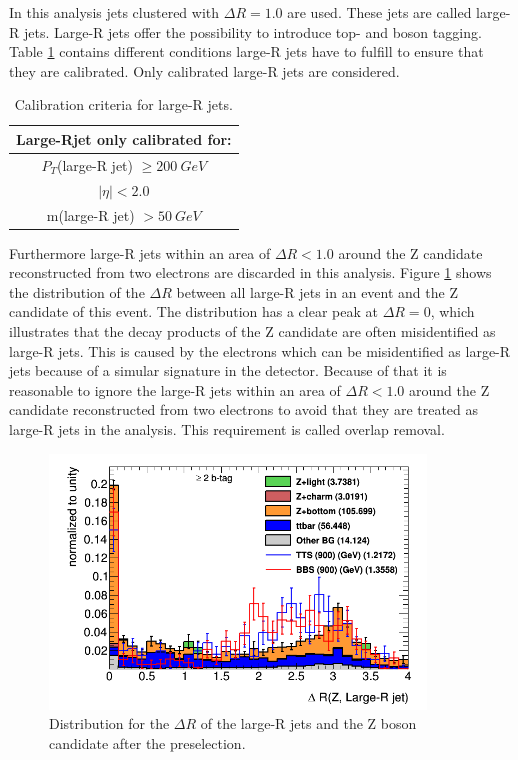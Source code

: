 In this analysis jets clustered with  $\Delta R = 1.0$ are used.   
These jets are called large-R jets. 
Large-R jets offer the possibility to introduce top- and boson tagging.
Table \ref{calibration} contains different conditions large-R jets have to fulfill to ensure that they are calibrated.
Only calibrated large-R jets are considered. 

\newpage

\begin{table}[h!]
\centering
\setlength{\tabcolsep}{3cm}
\begin{tabular}{|c|} 
\hline
\textbf{Large-Rjet only calibrated for:}\\
\hline
\hline
$P_{T}$(large-R jet) $\geq \SI{200}{GeV}$\\
$\mid \eta \mid < 2.0$ \\
m(large-R jet) $> \SI{50}{GeV}$\\
\hline
\end{tabular}
\caption{Calibration criteria for large-R jets.}
\label{calibration}
\end{table}


Furthermore large-R jets within an area of $\Delta R < 1.0$ around the Z candidate reconstructed from two electrons are discarded in this analysis.
Figure \ref{deltaR} shows the distribution of the $\Delta R$ between all large-R jets in an event and the Z candidate of this event.
The distribution has a clear peak at $\Delta R = 0$, which illustrates that the decay products of the Z candidate are often misidentified as large-R jets.
This is caused by the electrons which can be misidentified as large-R jets because of a simular signature in the detector.
Because of that it is reasonable to ignore the large-R jets within an area of $\Delta R < 1.0$ around the Z candidate reconstructed from two electrons to avoid that they are treated as large-R jets in the analysis.
This requirement is called overlap removal.

\begin{figure}
\centering
\includegraphics[width=10cm]{figures/deltaR.png}
\caption{Distribution for the $\Delta R$ of the large-R jets and the Z boson candidate after the preselection.}
\label{deltaR}
\end{figure}

